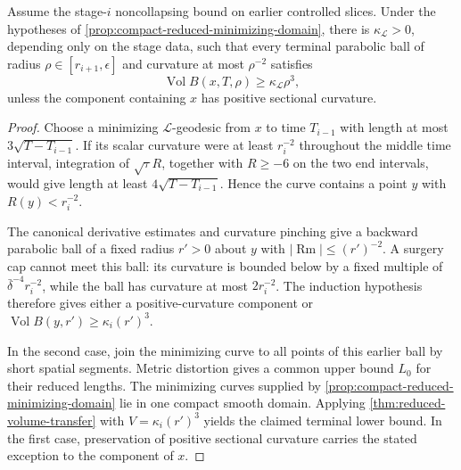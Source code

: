 \begin{lemma}
\label{lem:reduced-volume-noncollapsing-transfer}
\notready
Assume the stage-$i$ noncollapsing bound on earlier controlled slices.  Under
the hypotheses of \ref{prop:compact-reduced-minimizing-domain}, there is
$\kappa_{\mathcal L}>0$, depending only on the stage data, such that every
terminal parabolic ball of radius
$\rho\in[r_{i+1},\epsilon]$ and curvature at most $\rho^{-2}$ satisfies
\[
 \operatorname{Vol}B(x,T,\rho)\ge\kappa_{\mathcal L}\rho^3,
\]
unless the component containing $x$ has positive sectional curvature.
\end{lemma}

\begin{proof}
Choose a minimizing $\mathcal L$-geodesic from $x$ to time $T_{i-1}$ with
length at most $3\sqrt{T-T_{i-1}}$.  If its scalar curvature were at least
$r_i^{-2}$ throughout the middle time interval, integration of
$\sqrt\tau R$, together with $R\ge-6$ on the two end intervals, would give
length at least $4\sqrt{T-T_{i-1}}$.  Hence the curve contains a point $y$
with $R(y)<r_i^{-2}$.

The canonical derivative estimates and curvature pinching give a backward
parabolic ball of a fixed radius $r'>0$ about $y$ with
$|\operatorname{Rm}|\le(r')^{-2}$.  A surgery cap cannot meet this ball:
its curvature is bounded below by a fixed multiple of
$\bar\delta^{-4}r_i^{-2}$, while the ball has curvature at most
$2r_i^{-2}$.  The induction hypothesis therefore gives either a
positive-curvature component or
$\operatorname{Vol}B(y,r')\ge\kappa_i(r')^3$.

In the second case, join the minimizing curve to all points of this earlier
ball by short spatial segments.  Metric distortion gives a common upper
bound $L_0$ for their reduced lengths.  The minimizing curves supplied by
\ref{prop:compact-reduced-minimizing-domain} lie in one compact smooth
domain.  Applying \ref{thm:reduced-volume-transfer} with
$V=\kappa_i(r')^3$ yields the claimed terminal lower bound.  In the first
case, preservation of positive sectional curvature carries the stated
exception to the component of $x$.
\end{proof}

